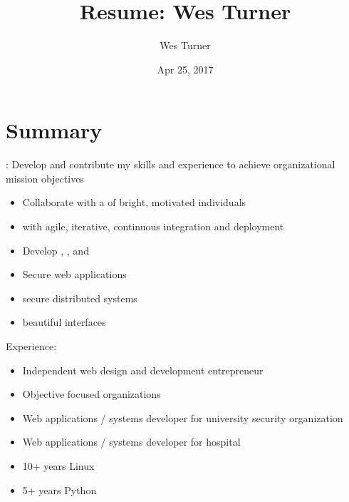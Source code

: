 \documentclass[letter,,openany,oneside,english]{sphinxhowto}
\title{Resume: Wes Turner}
\date{Apr 25, 2017}
\author{Wes Turner}
\begin{document}
\maketitle
\sphinxtableofcontents
{}\label{\detokenize{resume::doc}}

\newpage

\section{Summary}
\label{\detokenize{resume:summary}}\label{\detokenize{resume:id1}}

: Develop and contribute my skills and experience to
achieve organizational mission objectives

\begin{itemize}
\item {} 
Collaborate with a  of bright, motivated individuals

\item {} 
 with agile, iterative, continuous integration and deployment

\item {} 
Develop , , and 

\item {} 
Secure web applications

\item {} 
 secure distributed systems

\item {} 
 beautiful interfaces

\end{itemize}

Experience:
\begin{itemize}
\item {} 
Independent web design and development entrepreneur

\item {} 
Objective focused organizations

\item {} 
Web applications / systems developer for university security organization

\item {} 
Web applications / systems developer for hospital

\item {} 
10+ years Linux

\item {} 
5+ years Python

\end{itemize}
\newpage
\end{document}
